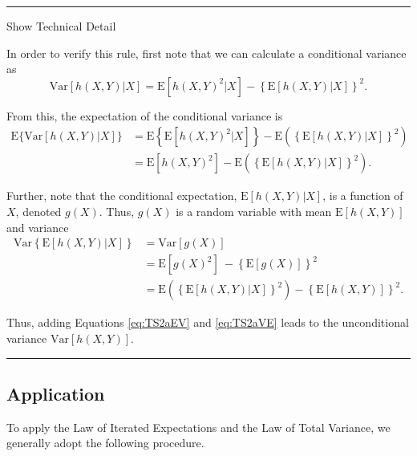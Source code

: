 \documentclass[]{book}
\theoremstyle{definition}
\theoremstyle{definition}
\theoremstyle{definition}
\theoremstyle{remark}
\begin{document}
\begin{center}\rule{0.5\linewidth}{\linethickness}\end{center}

Show Technical Detail

\hypertarget{EXM:S2a:LTV}{}
In order to verify this rule, first note that we can calculate a
conditional variance as
\[\mathrm{Var} \left[ h(X,Y) | X \right]  = \mathrm{E} [ h(X,Y)^2 | X ] -\left\{\mathrm{E} \left[ h(X,Y) | X \right] \right\}^2.\]

From this, the expectation of the conditional variance is
\[\begin{aligned}
    \mathrm{E}\{\mathrm{Var} \left[ h(X,Y) | X \right] \} &=
    \mathrm{E}\left\{\mathrm{E} \left[ h(X,Y)^2 | X \right] \right\} - \mathrm{E}\left(\left\{\mathrm{E} \left[ h(X,Y) | X \right] \right\}^2\right) \\
    &=\mathrm{E} \left[ h(X,Y)^2\right] - \mathrm{E}\left(\left\{\mathrm{E} \left[ h(X,Y) | X \right] \right\}^2\right).\label{eq:TS2aEV}
\end{aligned}\]

Further, note that the conditional expectation,
\(\mathrm{E} \left[ h(X,Y) | X \right]\), is a function of \(X\),
denoted \(g(X)\). Thus, \(g(X)\) is a random variable with mean
\(\mathrm{E}[h(X,Y)]\) and variance \[\begin{aligned}
    \mathrm{Var} \left\{ \mathrm{E} \left[ h(X,Y) | X \right] \right \} &=\mathrm{Var}[g(X)]  \nonumber \\
    &= \mathrm{E}[g(X)^2]\ - \left\{\mathrm{E}[g(X)]\right\}^2 \nonumber\\
    &= \mathrm{E}\left(\left\{\mathrm{E} \left[ h(X,Y) | X \right] \right\}^2\right)
    - \left\{\mathrm{E}[h(X,Y)]\right\}^2. \label{eq:TS2aVE}
\end{aligned}\]

Thus, adding Equations \eqref{eq:TS2aEV} and \eqref{eq:TS2aVE} leads to the
unconditional variance \(\mathrm{Var} \left[ h(X,Y) \right]\).

\begin{center}\rule{0.5\linewidth}{\linethickness}\end{center}

\subsection{Application}\label{application}

To apply the Law of Iterated Expectations and the Law of Total Variance,
we generally adopt the following procedure.
\end{document}
